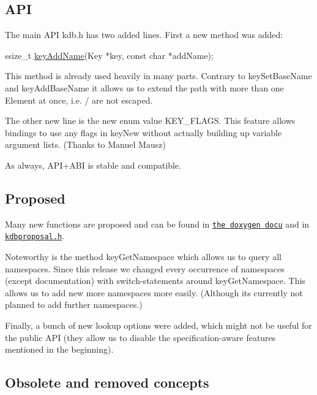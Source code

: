 \subsection*{A\+PI}

The main A\+PI kdb.\+h has two added lines. First a new method was added\+:


\begin{DoxyCode}
ssize\_t \hyperlink{group__keyname_gaa70593a2c772c4b7bc33423b9b10a270}{keyAddName}(Key *key, \textcolor{keyword}{const} \textcolor{keywordtype}{char} *addName);
\end{DoxyCode}


This method is already used heavily in many parts. Contrary to {\ttfamily key\+Set\+Base\+Name} and {\ttfamily key\+Add\+Base\+Name} it allows us to extend the path with more than one Element at once, i.\+e. {\ttfamily /} are not escaped.

The other new line is the new enum value {\ttfamily K\+E\+Y\+\_\+\+F\+L\+A\+GS}. This feature allows bindings to use any flags in key\+New without actually building up variable argument lists. (Thanks to Manuel Mausz)

As always, A\+P\+I+\+A\+BI is stable and compatible.

\subsection*{Proposed}

Many new functions are proposed and can be found in \href{https://doc.libelektra.org/api/0.8.11/html}{\tt the doxygen docu} and in \href{https://github.com/ElektraInitiative/libelektra/blob/master/src/include/kdbproposal.h}{\tt kdbproposal.\+h}.

Noteworthy is the method {\ttfamily key\+Get\+Namespace} which allows us to query all namespaces. Since this release we changed every occurrence of namespaces (except documentation) with switch-\/statements around {\ttfamily key\+Get\+Namespace}. This allows us to add new more namespaces more easily. (Although its currently not planned to add further namespaces.)

Finally, a bunch of new lookup options were added, which might not be useful for the public A\+PI (they allow us to disable the specification-\/aware features mentioned in the beginning).

\subsection*{Obsolete and removed concepts}

